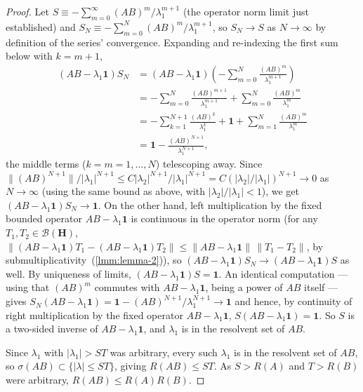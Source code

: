 \begin{proof}
Let $S \equiv -\sum_{m=0}^\infty (AB)^m/\lambda_1^{m+1}$ (the operator norm limit just established) and $S_N \equiv -\sum_{m=0}^N (AB)^m/\lambda_1^{m+1}$, so $S_N \to S$ as $N \to \infty$ by definition of the series' convergence. Expanding and re-indexing the first sum below with $k=m+1$,
\begin{align}
    (AB-\lambda_1\mathbf{1})S_N &= (AB-\lambda_1\mathbf{1}) \left( -\sum_{m=0}^N \frac{(AB)^m}{\lambda_1^{m+1}} \right) \\
                                &= -\sum_{m=0}^N \frac{(AB)^{m+1}}{\lambda_1^{m+1}} + \sum_{m=0}^N \frac{(AB)^m}{\lambda_1^m} \\
                                &= -\sum_{k=1}^{N+1} \frac{(AB)^k}{\lambda_1^k} + \mathbf{1} + \sum_{m=1}^N \frac{(AB)^m}{\lambda_1^m} \\
                                &= \mathbf{1} - \frac{(AB)^{N+1}}{\lambda_1^{N+1}},
\end{align}
the middle terms ($k=m=1,\ldots,N$) telescoping away. Since $\|(AB)^{N+1}\|/\lvert \lambda_1 \rvert^{N+1} \le C\lvert \lambda_2 \rvert^{N+1}/\lvert \lambda_1 \rvert^{N+1} = C(\lvert \lambda_2 \rvert/\lvert \lambda_1 \rvert)^{N+1} \to 0$ as $N \to \infty$ (using the same bound as above, with $\lvert \lambda_2 \rvert/\lvert \lambda_1 \rvert<1$), we get $(AB-\lambda_1\mathbf{1})S_N \to \mathbf{1}$. On the other hand, left multiplication by the fixed bounded operator $AB - \lambda_1\mathbf{1}$ is continuous in the operator norm (for any $T_1,T_2 \in \mathcal{B}(\mathbf{H})$, $\|(AB-\lambda_1\mathbf{1})T_1 - (AB-\lambda_1\mathbf{1})T_2\| \le \|AB-\lambda_1\mathbf{1}\|\,\|T_1-T_2\|$, by submultiplicativity~(\ref{lmm:lemma-2})), so $(AB-\lambda_1\mathbf{1})S_N \to (AB-\lambda_1\mathbf{1})S$ as well. By uniqueness of limits, $(AB-\lambda_1\mathbf{1})S = \mathbf{1}$. An identical computation — using that $(AB)^m$ commutes with $AB-\lambda_1\mathbf{1}$, being a power of $AB$ itself — gives $S_N(AB-\lambda_1\mathbf{1}) = \mathbf{1} - (AB)^{N+1}/\lambda_1^{N+1} \to \mathbf{1}$ and hence, by continuity of right multiplication by the fixed operator $AB-\lambda_1\mathbf{1}$, $S(AB-\lambda_1\mathbf{1}) = \mathbf{1}$. So $S$ is a two-sided inverse of $AB - \lambda_1\mathbf{1}$, and $\lambda_1$ is in the resolvent set of $AB$.

Since $\lambda_1$ with $\lvert \lambda_1 \rvert > ST$ was arbitrary, every such $\lambda_1$ is in the resolvent set of $AB$, so $\sigma(AB) \subset \{ \lvert \lambda \rvert \le ST \}$, giving $R(AB) \le ST$. As $S > R(A)$ and $T > R(B)$ were arbitrary, $R(AB) \le R(A)R(B)$.
\end{proof}

